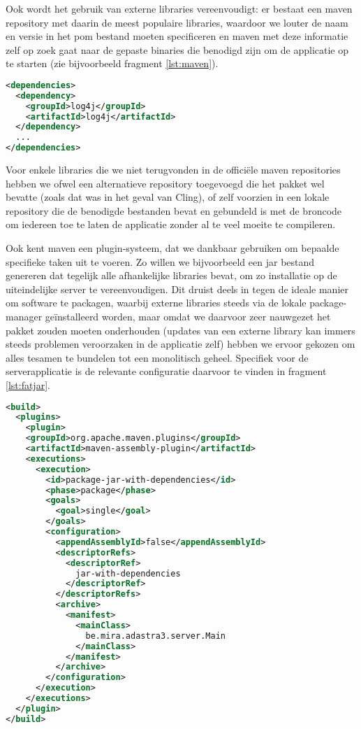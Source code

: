 Ook wordt het gebruik van externe libraries vereenvoudigt: er bestaat een \ac{maven} repository met daarin de meest populaire libraries, waardoor we louter de naam en versie in het \ac{pom} bestand moeten specificeren en \ac{maven} met deze informatie zelf op zoek gaat naar de gepaste binaries die benodigd zijn om de applicatie op te starten (zie bijvoorbeeld fragment \ref{lst:maven}).

\begin{lstlisting}[language=XML, float, caption=Inladen van externe libraries via Maven., label=lst:maven]
<dependencies>
  <dependency>
    <groupId>log4j</groupId>
    <artifactId>log4j</artifactId>
  </dependency>
  ...
</dependencies>
\end{lstlisting}

Voor enkele libraries die we niet terugvonden in de officiële \ac{maven} repositories hebben we ofwel een alternatieve repository toegevoegd die het pakket wel bevatte (zoals dat was in het geval van Cling), of zelf voorzien in een lokale repository die de benodigde bestanden bevat en gebundeld is met de broncode om iedereen toe te laten de applicatie zonder al te veel moeite te compileren.

Ook kent \ac{maven} een plugin-systeem, dat we dankbaar gebruiken om bepaalde specifieke taken uit te voeren. Zo willen we bijvoorbeeld een \ac{jar} bestand genereren dat tegelijk alle afhankelijke libraries bevat, om zo installatie op de uiteindelijke server te vereenvoudigen. Dit druist deels in tegen de ideale manier om software te packagen, waarbij externe libraries steeds via de lokale package-manager geïnstalleerd worden, maar omdat we daarvoor zeer nauwgezet het pakket zouden moeten onderhouden (updates van een externe library kan immers steeds problemen veroorzaken in de applicatie zelf) hebben we ervoor gekozen om alles tesamen te bundelen tot een monolitisch geheel. Specifiek voor de serverapplicatie is de relevante configuratie daarvoor te vinden in fragment \ref{lst:fatjar}.

\begin{lstlisting}[language=XML, float, caption=Gebruik van Maven modules om een executable te compileren., label=lst:fatjar]
<build>
  <plugins>
    <plugin>
    <groupId>org.apache.maven.plugins</groupId>
    <artifactId>maven-assembly-plugin</artifactId>
    <executions>
      <execution>
        <id>package-jar-with-dependencies</id>
        <phase>package</phase>
        <goals>
          <goal>single</goal>
        </goals>
        <configuration>
          <appendAssemblyId>false</appendAssemblyId>
          <descriptorRefs>
            <descriptorRef>
              jar-with-dependencies
            </descriptorRef>
          </descriptorRefs>
          <archive>
            <manifest>
              <mainClass>
                be.mira.adastra3.server.Main
              </mainClass>
            </manifest>
          </archive>
        </configuration>
      </execution>
    </executions>
  </plugin>
</build>
\end{lstlisting}


